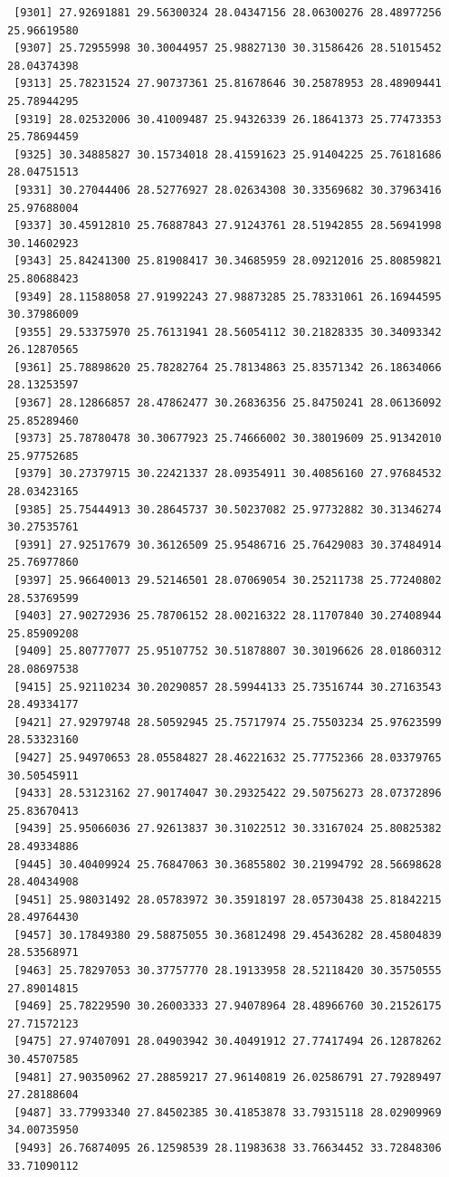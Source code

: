 \documentclass[
  letterpaper,
  DIV=11,
  numbers=noendperiod]{scrartcl}
\begin{document}
\begin{verbatim}
 [9301] 27.92691881 29.56300324 28.04347156 28.06300276 28.48977256 25.96619580
 [9307] 25.72955998 30.30044957 25.98827130 30.31586426 28.51015452 28.04374398
 [9313] 25.78231524 27.90737361 25.81678646 30.25878953 28.48909441 25.78944295
 [9319] 28.02532006 30.41009487 25.94326339 26.18641373 25.77473353 25.78694459
 [9325] 30.34885827 30.15734018 28.41591623 25.91404225 25.76181686 28.04751513
 [9331] 30.27044406 28.52776927 28.02634308 30.33569682 30.37963416 25.97688004
 [9337] 30.45912810 25.76887843 27.91243761 28.51942855 28.56941998 30.14602923
 [9343] 25.84241300 25.81908417 30.34685959 28.09212016 25.80859821 25.80688423
 [9349] 28.11588058 27.91992243 27.98873285 25.78331061 26.16944595 30.37986009
 [9355] 29.53375970 25.76131941 28.56054112 30.21828335 30.34093342 26.12870565
 [9361] 25.78898620 25.78282764 25.78134863 25.83571342 26.18634066 28.13253597
 [9367] 28.12866857 28.47862477 30.26836356 25.84750241 28.06136092 25.85289460
 [9373] 25.78780478 30.30677923 25.74666002 30.38019609 25.91342010 25.97752685
 [9379] 30.27379715 30.22421337 28.09354911 30.40856160 27.97684532 28.03423165
 [9385] 25.75444913 30.28645737 30.50237082 25.97732882 30.31346274 30.27535761
 [9391] 27.92517679 30.36126509 25.95486716 25.76429083 30.37484914 25.76977860
 [9397] 25.96640013 29.52146501 28.07069054 30.25211738 25.77240802 28.53769599
 [9403] 27.90272936 25.78706152 28.00216322 28.11707840 30.27408944 25.85909208
 [9409] 25.80777077 25.95107752 30.51878807 30.30196626 28.01860312 28.08697538
 [9415] 25.92110234 30.20290857 28.59944133 25.73516744 30.27163543 28.49334177
 [9421] 27.92979748 28.50592945 25.75717974 25.75503234 25.97623599 28.53323160
 [9427] 25.94970653 28.05584827 28.46221632 25.77752366 28.03379765 30.50545911
 [9433] 28.53123162 27.90174047 30.29325422 29.50756273 28.07372896 25.83670413
 [9439] 25.95066036 27.92613837 30.31022512 30.33167024 25.80825382 28.49334886
 [9445] 30.40409924 25.76847063 30.36855802 30.21994792 28.56698628 28.40434908
 [9451] 25.98031492 28.05783972 30.35918197 28.05730438 25.81842215 28.49764430
 [9457] 30.17849380 29.58875055 30.36812498 29.45436282 28.45804839 28.53568971
 [9463] 25.78297053 30.37757770 28.19133958 28.52118420 30.35750555 27.89014815
 [9469] 25.78229590 30.26003333 27.94078964 28.48966760 30.21526175 27.71572123
 [9475] 27.97407091 28.04903942 30.40491912 27.77417494 26.12878262 30.45707585
 [9481] 27.90350962 27.28859217 27.96140819 26.02586791 27.79289497 27.28188604
 [9487] 33.77993340 27.84502385 30.41853878 33.79315118 28.02909969 34.00735950
 [9493] 26.76874095 26.12598539 28.11983638 33.76634452 33.72848306 33.71090112

\end{verbatim}
\end{document}
